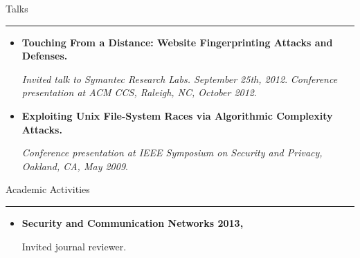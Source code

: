 \documentclass[11pt,oneside]{article}
\newenvironment{ressection}[1]{
	{\fontfamily{phv}\selectfont\Large#1}
	
	\vspace{-8pt} \rule{\textwidth}{.5pt}
	
	\vspace{-4pt}
	\begin{itemize}
	\vspace{.5pt}
}{
	\end{itemize}
}
\newcommand{\resitem}[1]{
	\vspace{2pt}
	\item \begin{flushleft} #1 \end{flushleft}
}
\begin{document}
\begin{ressection}{Talks}
	\resitem{\textbf{Touching From a Distance: Website Fingerprinting
		Attacks and Defenses.} \begin{small}
		
		\textit{Invited talk to Symantec Research Labs. September 25th, 2012}. \textit{Conference presentation at ACM CCS, Raleigh, NC, October 2012}.
		\end{small}}

	\resitem{\textbf{Exploiting Unix File-System Races via Algorithmic
		Complexity Attacks.} \begin{small}
		
		\textit{Conference presentation at IEEE Symposium on Security and Privacy, Oakland, CA, May 2009}.
		\end{small}}
\end{ressection}

\begin{ressection}{Academic Activities}
	\resitem{\textbf{Security and Communication Networks 2013, } \begin{small}Invited journal reviewer.\end{small}
	}
\end{ressection}
\end{document}

